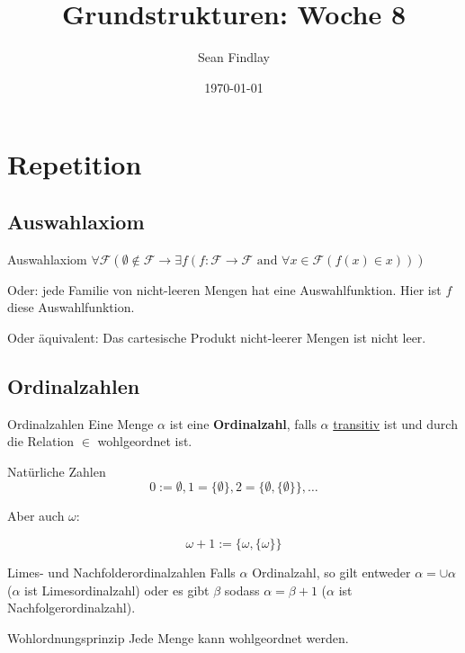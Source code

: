 \documentclass[12pt]{article}
\title{Grundstrukturen: Woche 8}
\author{Sean Findlay}
\date{\today}
\begin{document}
\maketitle

\section{Repetition}

\subsection{Auswahlaxiom}

\begin{theorem}{Auswahlaxiom}{}
$\forall \mathcal{F} (\emptyset \notin \mathcal{F} \rightarrow \exists f (f: \mathcal{F} \rightarrow \mathcal{F} \text{ and } \forall x \in \mathcal{F}(f(x) \in x)))$

Oder: jede Familie von nicht-leeren Mengen hat eine Auswahlfunktion. Hier ist $f$ diese Auswahlfunktion.

Oder äquivalent: Das cartesische Produkt nicht-leerer Mengen ist nicht leer.
\end{theorem}

\subsection{Ordinalzahlen}
\begin{definition}{Ordinalzahlen}{}
Eine Menge $\alpha$ ist eine \textbf{Ordinalzahl}, falls $\alpha$ \underline{transitiv} ist und durch die Relation $\in$ wohlgeordnet ist.
\end{definition}

\begin{example}{Natürliche Zahlen}{}
$$
0 := \emptyset, 1 = \{{\emptyset}\}, 2 = \{\emptyset, \{\emptyset\}\}, \dots
$$

Aber auch $\omega$:

$$
\omega + 1 := \{\omega, \{\omega\}\}
$$
\end{example}

\begin{remark}{Limes- und Nachfolderordinalzahlen}{}
    Falls $\alpha$ Ordinalzahl, so gilt entweder $\alpha = \cup \alpha$ ($\alpha$ ist Limesordinalzahl) oder es gibt $\beta$ sodass $\alpha = \beta + 1$ ($\alpha$ ist Nachfolgerordinalzahl).
\end{remark}

\begin{theorem}{Wohlordnungsprinzip}{}
Jede Menge kann wohlgeordnet werden.
\end{theorem}
\end{document}
